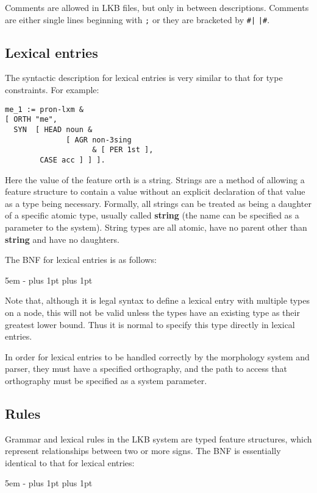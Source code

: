 \documentclass[12pt]{report}
\begin{document}
Comments are allowed in LKB files, but only in between descriptions.
Comments are either single lines
beginning with {\tt ;} or they are bracketed by {\tt \#|} {\tt |\#}.



\subsection{Lexical entries}
\label{lexsyntax}
The syntactic description for lexical entries is
very similar to that for type constraints.  For example:
\begin{verbatim}
me_1 := pron-lxm & 
[ ORTH "me",
  SYN  [ HEAD noun & 
              [ AGR non-3sing 
                    & [ PER 1st ],
		CASE acc ] ] ].
\end{verbatim}
Here the value of the feature {\sc orth} is a string.
Strings are a method of allowing a feature structure to contain a 
value without an explicit declaration of that value as a type
being necessary.  Formally, all strings can be treated as
being a daughter of a specific atomic type, usually called {\bf string}
(the name can be specified as a parameter to the system).
String types are all atomic,
have no parent other than {\bf string} and have no daughters.

The BNF for lexical entries is as follows:
\begin{list}{}
   {\leftmargin 5em
    \itemindent -\leftmargin
    \itemsep 0pt plus 1pt
    \parsep 0pt plus 1pt}
\end{list}
Note that, although it is legal syntax to define a 
lexical entry with multiple types on a node,
this will not be valid unless the types have an
existing type as their greatest lower bound.
Thus it is normal to specify this type directly
in lexical entries.

In order for lexical entries to be handled correctly by
the morphology system and parser, they must have a specified
orthography, and the path to access that orthography
must be specified as a system parameter.

\subsection{Rules}
\label{rules}
Grammar and lexical rules in the LKB 
system are typed feature structures,
which represent relationships between two or more signs.
The BNF is essentially identical to that for
lexical entries:
\begin{list}{}
   {\leftmargin 5em
    \itemindent -\leftmargin
    \itemsep 0pt plus 1pt
    \parsep 0pt plus 1pt}
\end{list}
\end{document}
